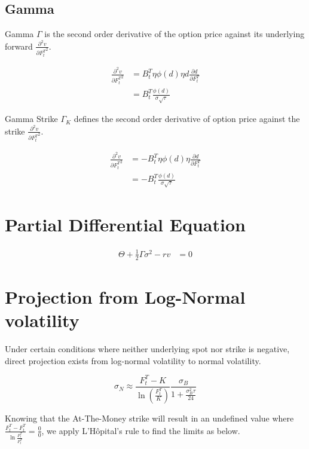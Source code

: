 \documentclass{article}
\begin{document}
\subsection{Gamma}

Gamma $ \Gamma $ is the second order derivative of the option price against its underlying forward $ \frac{\partial^2 v}{\partial {F_t^T}^2} $.

\begin{align} \label{Gamma Formula}
    \frac{\partial^2 v}{\partial {F_t^T}^2} &= B_t^T \eta \phi(d) \eta d \frac{\partial d}{\partial F_t^T} \nonumber \\
    &= B_t^T \frac{\phi(d)}{\sigma \sqrt{\tau}} 
\end{align}

Gamma Strike $ \Gamma_K $ defines the second order derivative of option price against the strike $ \frac{\partial^2 v}{\partial {F_t^T}^2} $. 

\begin{align} \label{Gamma_K Formula}
    \frac{\partial^2 v}{\partial {F_t^T}^2} &= -B_t^T \eta \phi(d) \eta \frac{\partial d}{\partial F_t^T} \nonumber \\
    &= -B_t^T \frac{\phi(d)}{\sigma \sqrt{\tau}}
\end{align}


\section{Partial Differential Equation}

\begin{align} \label{Normal Model PDE}
    \Theta + \frac{1}{2} \Gamma \sigma^2 - r v &= 0
\end{align}


\section{Projection from Log-Normal volatility}

Under certain conditions where neither underlying spot nor strike is negative, direct projection exists from log-normal volatility to normal volatility.

\begin{equation} \label{Projection from Log-Normal Vol}
    \sigma_N \approx \frac{F_t^T - K}{\ln{\left(\frac{F_t^T}{K}\right)}} \frac{\sigma_B}{1 + \frac{\sigma_B^2 \tau}{24}}
\end{equation}

Knowing that the At-The-Money strike will result in an undefined value where $ \frac{F_t^T - F_t^T}{\ln\frac{F_t^T}{F_t^T}} = \frac{0}{0}$, we apply L'Hôpital's rule to find the limits as below.
\end{document}

